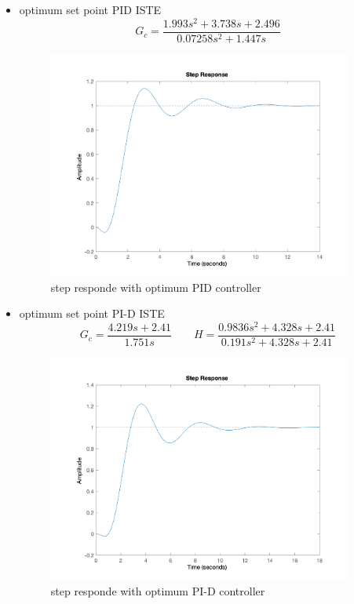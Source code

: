 \begin{itemize}
\begin{figure}[H]
    \end{figure}  
    \item optimum set point PID ISTE
    $$
    G_c =   \dfrac{1.993 s^2 + 3.738 s + 2.496}{0.07258 s^2 + 1.447 s}
    $$ 
    \begin{figure}[H]
        \caption{step responde with optimum PID controller}
        \centering
        \includegraphics[width=10cm]{../Figure/Q1/b/optpid.png}
    \end{figure}  
    \item optimum set point PI-D ISTE
    $$
    G_c =   \dfrac{4.219 s + 2.41}{1.751 s} \qquad H = \frac{0.9836 s^2 + 4.328 s + 2.41}{0.191 s^2 + 4.328 s + 2.41}
    $$ 
    \begin{figure}[H]
        \caption{step responde with optimum PI-D controller}
        \centering
        \includegraphics[width=10cm]{../Figure/Q1/b/optpi-d.png}
    \end{figure}  
\end{itemize}

